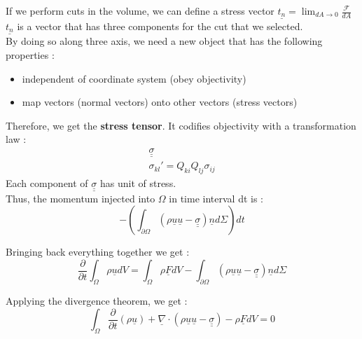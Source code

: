 \documentclass[../main.tex]{subfiles}
\begin{document}
If we perform cuts in the volume, we can define a stress vector $\underline{t_n} = \lim_{dA\to 0} \frac{\mathcal{F}}{dA}$\\

\color{gray} $\underline{t_n}$ is a vector that has three components for the cut that we selected.\color{black}\\

By doing so along three axis, we need a new object that has the following properties :\\
\begin{itemize}
    \item independent of coordinate system (obey objectivity)\\
    \item map vectors (normal vectors) onto other vectors (stress vectors)\\
\end{itemize}

Therefore, we get the \textbf{stress tensor}. It codifies objectivity with a transformation law :\\
\begin{equation}
\begin{split}
    \underline{\underline{\sigma}}\\
    \sigma_{kl}' = Q_{ki} Q_{lj} \sigma_{ij}
\end{split}
\end{equation}
Each component of $\underline{\underline{\sigma}}$ has unit of stress.\\

Thus, the momentum injected into $\Omega$ in time interval dt is :\\
\begin{equation}
    -(\int_{\partial \Omega} (\rho \underline{u} \underline{u}-\underline{\underline{\sigma}})\underline{n}d\Sigma)dt
\end{equation}

Bringing back everything together we get :\\
\begin{equation}
    \frac{\partial}{\partial t} \int_\Omega \rho \underline{u} dV = \int_\Omega \rho \underline{F}dV- \int_{\partial \Omega} (\rho \underline{u} \underline{u}-\underline{\underline{\sigma}})\underline{n}d\Sigma
\end{equation}

Applying the divergence theorem, we get :\\
\begin{equation}
    \int_\Omega \frac{\partial}{\partial t} (\rho \underline{u}) + \underline{\nabla}\cdot (\rho \underline{u} \underline{u}-\underline{\underline{\sigma}}) - \rho \underline{F} dV= 0
\end{equation}
\end{document}
